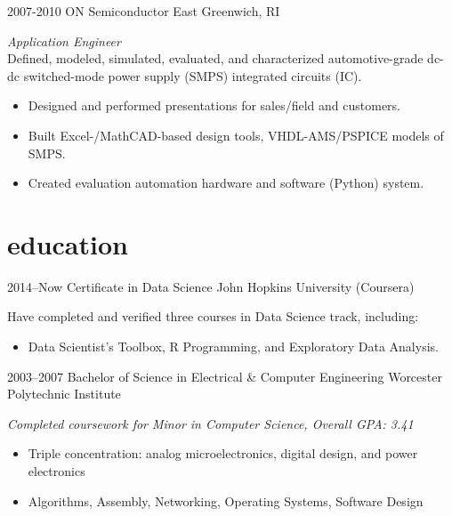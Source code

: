 \documentclass[]{vitae-cv}
\begin{document}
\begin{entrylist}

\entry
{2007-2010}
{ON Semiconductor}
{East Greenwich, RI}
{\emph{Application Engineer} \\
Defined, modeled, simulated, evaluated, and characterized automotive-grade dc-dc switched-mode power supply (SMPS) integrated circuits (IC).
\begin{itemize}
\item Designed and performed presentations for sales/field and customers.
\item Built Excel-/MathCAD-based design tools, VHDL-AMS/PSPICE models of SMPS.
\item Created evaluation automation hardware and software (Python) system.
\end{itemize}}


\end{entrylist}


\section{education}

\begin{entrylist}


\entry
{2014--Now}
{Certificate {\normalfont in Data Science}}
{John Hopkins University (Coursera)}
{Have completed and verified three courses in Data Science track,
  including:
\begin{itemize}
\item Data Scientist's Toolbox, R Programming, and Exploratory Data
  Analysis.
\end{itemize}}

\entry
{2003--2007}
{Bachelor of Science {\normalfont in Electrical \& Computer Engineering}}
{Worcester Polytechnic Institute}
{\emph{Completed coursework for Minor in Computer Science,
  Overall GPA: 3.41}
\begin{itemize}
\item Triple concentration: analog microelectronics, digital design, and power electronics
\item Algorithms, Assembly, Networking, Operating Systems, Software Design
\end{itemize}}

\end{entrylist}
\end{document}

